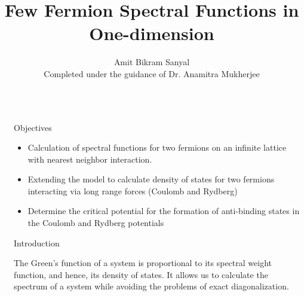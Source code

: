 \documentclass[final]{beamer}
\title{Few Fermion Spectral Functions in One-dimension} %
\author{Amit Bikram Sanyal\\Completed under the guidance of Dr. Anamitra Mukherjee} %
\institute{National Institute of Science Education and Research} %
\newlength{\sepwid}
\newlength{\onecolwid}
\begin{document}

\setlength{\belowcaptionskip}{2ex} %
\setlength\belowdisplayshortskip{2ex} %

\begin{frame}[t] %

\begin{columns}[t] %

\begin{column}{\sepwid}\end{column} %

\begin{column}{\onecolwid} %


\begin{alertblock}{Objectives}
\begin{itemize}
\item Calculation of spectral functions for two fermions on an infinite lattice with nearest neighbor interaction.
\item Extending the model to calculate density of states for two fermions interacting via long range forces (Coulomb and Rydberg)
\item Determine the critical potential for the formation of anti-binding states in the Coulomb and Rydberg potentials
\end{itemize}

\end{alertblock}

\begin{block}{Introduction}

The Green's function of a system is proportional to its spectral weight function, and hence, its density of states. It allows us to calculate the spectrum of a system while avoiding the problems of exact diagonalization.


\end{block}
\end{column}
\end{columns}
\end{frame}
\end{document}
